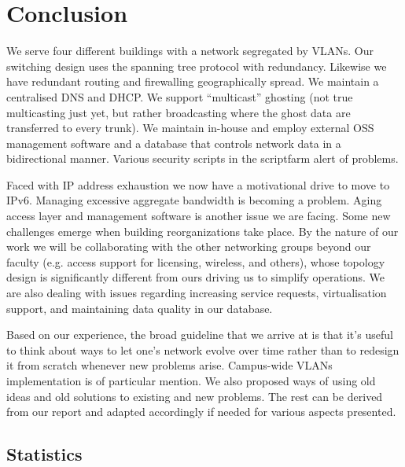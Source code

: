 \section{Conclusion}
\label{sect:conclusion}

We serve four different buildings with a network
segregated by VLANs. Our switching design uses
the spanning tree protocol with redundancy.
Likewise we have redundant routing and firewalling geographically spread.
We maintain a centralised DNS and DHCP.
We support ``multicast'' ghosting (not true multicasting just yet, but
rather broadcasting where the ghost data are transferred to every trunk).
We maintain in-house and employ external OSS management software and a database that controls network data
in a bidirectional manner.
Various security scripts in the scriptfarm alert of problems.

Faced with IP address exhaustion we now have a motivational
drive to move to IPv6. Managing excessive aggregate bandwidth
is becoming a problem. Aging access layer and management software
is another issue we are facing. Some new challenges emerge
when building reorganizations take place. By the nature of our
work we will be collaborating with the other networking groups
beyond our faculty (e.g. access support for licensing, wireless,
and others), whose topology design is significantly different from ours
driving us to simplify operations. We are also dealing with
issues regarding increasing service requests, virtualisation support,
and maintaining data quality in our database.

Based on our experience, the broad guideline that we arrive at
is that it's useful to think about ways to let one's network evolve
over time rather than to redesign it from scratch whenever new
problems arise. Campus-wide VLANs implementation is of particular
mention. We also proposed ways of using old ideas and old solutions
to existing and new problems.
The rest can be derived from our report and adapted
accordingly if needed for various aspects presented.


\subsection{Statistics}

